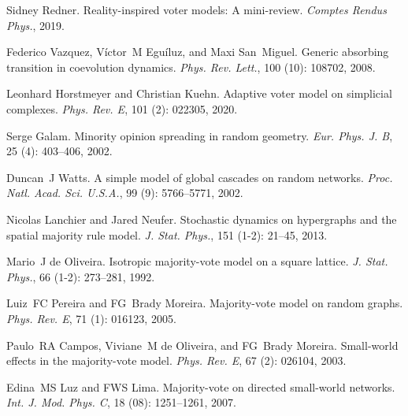 Sidney Redner.
\newblock Reality-inspired voter models: {{A}} mini-review.
\newblock \emph{Comptes Rendus Phys.}, 2019.

Federico Vazquez, V{\'i}ctor~M Egu{\'i}luz, and Maxi San~Miguel.
\newblock Generic absorbing transition in coevolution dynamics.
\newblock \emph{Phys. Rev. Lett.}, 100 (10): 108702, 2008.

Leonhard Horstmeyer and Christian Kuehn.
\newblock Adaptive voter model on simplicial complexes.
\newblock \emph{Phys. Rev. E}, 101 (2): 022305, 2020.

Serge Galam.
\newblock Minority opinion spreading in random geometry.
\newblock \emph{Eur. Phys. J. B}, 25 (4): 403--406, 2002.

Duncan~J Watts.
\newblock A simple model of global cascades on random networks.
\newblock \emph{Proc. Natl. Acad. Sci. U.S.A.}, 99 (9):
5766--5771, 2002.

Nicolas Lanchier and Jared Neufer.
\newblock Stochastic dynamics on hypergraphs and the spatial majority rule
model.
\newblock \emph{J. Stat. Phys.}, 151 (1-2): 21--45, 2013.

Mario~J {de Oliveira}.
\newblock Isotropic majority-vote model on a square lattice.
\newblock \emph{J. Stat. Phys.}, 66 (1-2): 273--281, 1992.

Luiz~FC Pereira and FG~Brady Moreira.
\newblock Majority-vote model on random graphs.
\newblock \emph{Phys. Rev. E}, 71 (1): 016123, 2005.

Paulo~RA Campos, Viviane~M {de Oliveira}, and FG~Brady Moreira.
\newblock Small-world effects in the majority-vote model.
\newblock \emph{Phys. Rev. E}, 67 (2): 026104, 2003.

Edina~MS Luz and FWS Lima.
\newblock Majority-vote on directed small-world networks.
\newblock \emph{Int. J. Mod. Phys. C}, 18 (08): 1251--1261,
2007.

